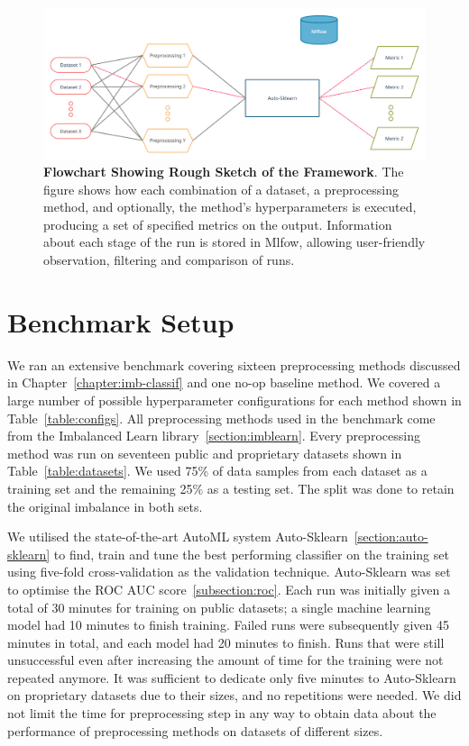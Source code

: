 \begin{figure}
    \centering
    \includegraphics[width=\linewidth]{figures/diagram.png}
    \caption{
        \textbf{Flowchart Showing Rough Sketch of the Framework}. The figure shows how each
        combination of a dataset, a preprocessing method, and optionally, the method's
        hyperparameters is executed, producing a set of specified metrics on the output.
        Information about each stage of the run is stored in Mlfow, allowing user-friendly
        observation, filtering and comparison of runs.
    }
    \label{figure:framework}
\end{figure}


\section{Benchmark Setup}
\label{subsection:benchmark}

We ran an extensive benchmark covering sixteen preprocessing methods discussed in
Chapter~\ref{chapter:imb-classif} and one no-op baseline method. We covered a large number of
possible hyperparameter configurations for each method shown in Table~\ref{table:configs}. All
preprocessing methods used in the benchmark come from the Imbalanced Learn
library~\ref{section:imblearn}. Every preprocessing method was run on seventeen public and
proprietary datasets shown in Table~\ref{table:datasets}. We used 75\% of data samples from each
dataset as a training set and the remaining 25\% as a testing set. The split was done to retain the
original imbalance in both sets.

We utilised the state-of-the-art AutoML system Auto-Sklearn~\ref{section:auto-sklearn} to find,
train and tune the best performing classifier on the training set using five-fold cross-validation
as the validation technique. Auto-Sklearn was set to optimise the ROC AUC
score~\ref{subsection:roc}. Each run was initially given a total of 30 minutes for training on
public datasets; a single machine learning model had 10 minutes to finish training. Failed runs
were subsequently given 45 minutes in total, and each model had 20 minutes to finish. Runs that
were still unsuccessful even after increasing the amount of time for the training were not repeated
anymore. It was sufficient to dedicate only five minutes to Auto-Sklearn on proprietary datasets
due to their sizes, and no repetitions were needed. We did not limit the time for preprocessing
step in any way to obtain data about the performance of preprocessing methods on datasets of
different sizes.


